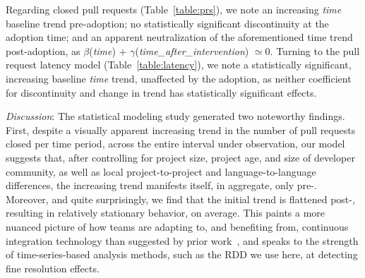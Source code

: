Regarding closed pull requests (Table~\ref{table:prs}), we note an increasing
\emph{time} baseline trend pre-adoption; no statistically significant discontinuity
at the adoption time; and an apparent neutralization of the aforementioned time
trend post-adoption, as $\beta$(\emph{time}) $+$ 
$\gamma$(\emph{time\_after\_intervention}) $\simeq 0$.
%
Turning to the pull request latency model (Table~\ref{table:latency}), we note
a statistically significant, increasing baseline \emph{time} trend, 
unaffected by the \Tvis adoption, as neither coefficient for discontinuity and
change in trend has statistically significant effects.



\smallskip\noindent \emph{Discussion}:
The statistical modeling study generated two noteworthy findings.
First, despite a visually apparent increasing trend in the number of pull requests 
closed per time period, across the entire interval under observation, our model 
suggests that, after controlling for project size, project age, and size of developer 
community, as well as local project-to-project and language-to-language differences, 
the increasing trend manifests itself, in aggregate, only pre-\Tvi.
Moreover, and quite surprisingly, we find that the initial trend is flattened post-\Tvi,
resulting in relatively stationary behavior, on average.
This paints a more nuanced picture of how \GH teams are adapting to, and
benefiting from, continuous integration technology than suggested by prior
work~\cite{VasilescuYWDF15}, and speaks to the strength of time-series-based
analysis methods, such as the RDD we use here, at detecting fine resolution effects.

